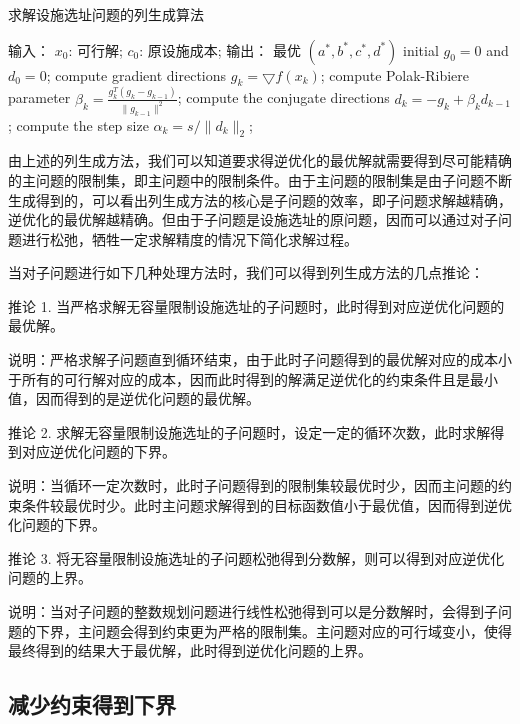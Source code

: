 \documentclass[UTF8]{article}
\begin{document}
\begin{algorithm}[h]
\caption{求解设施选址问题的列生成算法}
\label{CG}
\begin{algorithmic}[1]
输入：
$x_0$: 可行解;
$c_0$: 原设施成本;
输出：
最优 $(a^{*},b^{*},c^{*},d^{*})$
\State initial $g_0=0$ and $d_0=0$;
\Repeat
\State compute gradient directions $g_k=\bigtriangledown f(x_k)$;
\State compute Polak-Ribiere parameter $\beta_k=\frac{g_k^{T}(g_k-g_{k-1})}{\parallel g_{k-1} \parallel^{2}}$;
\State compute the conjugate directions $d_k=-g_k+\beta_k d_{k-1}$;
\State compute the step size $\alpha_k=s/\parallel d_k \parallel_{2}$;
\end{algorithmic}
\end{algorithm}




由上述的列生成方法，我们可以知道要求得逆优化的最优解就需要得到尽可能精确的主问题的限制集，即主问题中的限制条件。由于主问题的限制集是由子问题不断生成得到的，可以看出列生成方法的核心是子问题的效率，即子问题求解越精确，逆优化的最优解越精确。但由于子问题是设施选址的原问题，因而可以通过对子问题进行松弛，牺牲一定求解精度的情况下简化求解过程。

当对子问题进行如下几种处理方法时，我们可以得到列生成方法的几点推论：

推论 1. 当严格求解无容量限制设施选址的子问题时，此时得到对应逆优化问题的最优解。

说明：严格求解子问题直到循环结束，由于此时子问题得到的最优解对应的成本小于所有的可行解对应的成本，因而此时得到的解满足逆优化的约束条件且是最小值，因而得到的是逆优化问题的最优解。

推论 2. 求解无容量限制设施选址的子问题时，设定一定的循环次数，此时求解得到对应逆优化问题的下界。

说明：当循环一定次数时，此时子问题得到的限制集较最优时少，因而主问题的约束条件较最优时少。此时主问题求解得到的目标函数值小于最优值，因而得到逆优化问题的下界。

推论 3. 将无容量限制设施选址的子问题松弛得到分数解，则可以得到对应逆优化问题的上界。

说明：当对子问题的整数规划问题进行线性松弛得到可以是分数解时，会得到子问题的下界，主问题会得到约束更为严格的限制集。主问题对应的可行域变小，使得最终得到的结果大于最优解，此时得到逆优化问题的上界。

\subsection{减少约束得到下界}
\end{document}
